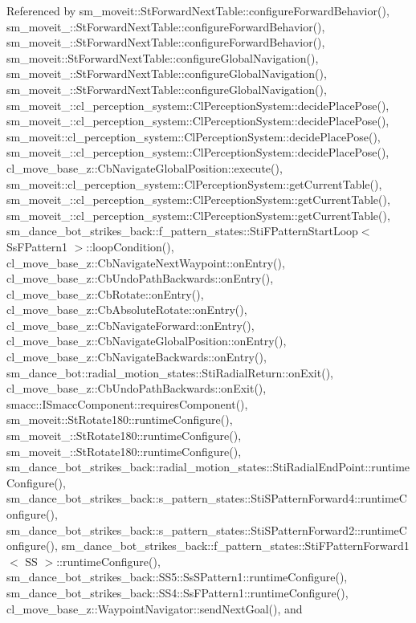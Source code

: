 Referenced by sm\+\_\+moveit\+::\+St\+Forward\+Next\+Table\+::configure\+Forward\+Behavior(), sm\+\_\+moveit\+\_\+::\+St\+Forward\+Next\+Table\+::configure\+Forward\+Behavior(), sm\+\_\+moveit\+\_\+::\+St\+Forward\+Next\+Table\+::configure\+Forward\+Behavior(), sm\+\_\+moveit\+::\+St\+Forward\+Next\+Table\+::configure\+Global\+Navigation(), sm\+\_\+moveit\+\_\+::\+St\+Forward\+Next\+Table\+::configure\+Global\+Navigation(), sm\+\_\+moveit\+\_\+::\+St\+Forward\+Next\+Table\+::configure\+Global\+Navigation(), sm\+\_\+moveit\+\_\+::cl\+\_\+perception\+\_\+system\+::\+Cl\+Perception\+System\+::decide\+Place\+Pose(), sm\+\_\+moveit\+\_\+::cl\+\_\+perception\+\_\+system\+::\+Cl\+Perception\+System\+::decide\+Place\+Pose(), sm\+\_\+moveit\+::cl\+\_\+perception\+\_\+system\+::\+Cl\+Perception\+System\+::decide\+Place\+Pose(), sm\+\_\+moveit\+\_\+::cl\+\_\+perception\+\_\+system\+::\+Cl\+Perception\+System\+::decide\+Place\+Pose(), cl\+\_\+move\+\_\+base\+\_\+z\+::\+Cb\+Navigate\+Global\+Position\+::execute(), sm\+\_\+moveit\+::cl\+\_\+perception\+\_\+system\+::\+Cl\+Perception\+System\+::get\+Current\+Table(), sm\+\_\+moveit\+\_\+::cl\+\_\+perception\+\_\+system\+::\+Cl\+Perception\+System\+::get\+Current\+Table(), sm\+\_\+moveit\+\_\+::cl\+\_\+perception\+\_\+system\+::\+Cl\+Perception\+System\+::get\+Current\+Table(), sm\+\_\+dance\+\_\+bot\+\_\+strikes\+\_\+back\+::f\+\_\+pattern\+\_\+states\+::\+Sti\+F\+Pattern\+Start\+Loop$<$ Ss\+F\+Pattern1 $>$\+::loop\+Condition(), cl\+\_\+move\+\_\+base\+\_\+z\+::\+Cb\+Navigate\+Next\+Waypoint\+::on\+Entry(), cl\+\_\+move\+\_\+base\+\_\+z\+::\+Cb\+Undo\+Path\+Backwards\+::on\+Entry(), cl\+\_\+move\+\_\+base\+\_\+z\+::\+Cb\+Rotate\+::on\+Entry(), cl\+\_\+move\+\_\+base\+\_\+z\+::\+Cb\+Absolute\+Rotate\+::on\+Entry(), cl\+\_\+move\+\_\+base\+\_\+z\+::\+Cb\+Navigate\+Forward\+::on\+Entry(), cl\+\_\+move\+\_\+base\+\_\+z\+::\+Cb\+Navigate\+Global\+Position\+::on\+Entry(), cl\+\_\+move\+\_\+base\+\_\+z\+::\+Cb\+Navigate\+Backwards\+::on\+Entry(), sm\+\_\+dance\+\_\+bot\+::radial\+\_\+motion\+\_\+states\+::\+Sti\+Radial\+Return\+::on\+Exit(), cl\+\_\+move\+\_\+base\+\_\+z\+::\+Cb\+Undo\+Path\+Backwards\+::on\+Exit(), smacc\+::\+I\+Smacc\+Component\+::requires\+Component(), sm\+\_\+moveit\+::\+St\+Rotate180\+::runtime\+Configure(), sm\+\_\+moveit\+\_\+::\+St\+Rotate180\+::runtime\+Configure(), sm\+\_\+moveit\+\_\+::\+St\+Rotate180\+::runtime\+Configure(), sm\+\_\+dance\+\_\+bot\+\_\+strikes\+\_\+back\+::radial\+\_\+motion\+\_\+states\+::\+Sti\+Radial\+End\+Point\+::runtime\+Configure(), sm\+\_\+dance\+\_\+bot\+\_\+strikes\+\_\+back\+::s\+\_\+pattern\+\_\+states\+::\+Sti\+S\+Pattern\+Forward4\+::runtime\+Configure(), sm\+\_\+dance\+\_\+bot\+\_\+strikes\+\_\+back\+::s\+\_\+pattern\+\_\+states\+::\+Sti\+S\+Pattern\+Forward2\+::runtime\+Configure(), sm\+\_\+dance\+\_\+bot\+\_\+strikes\+\_\+back\+::f\+\_\+pattern\+\_\+states\+::\+Sti\+F\+Pattern\+Forward1$<$ S\+S $>$\+::runtime\+Configure(), sm\+\_\+dance\+\_\+bot\+\_\+strikes\+\_\+back\+::\+S\+S5\+::\+Ss\+S\+Pattern1\+::runtime\+Configure(), sm\+\_\+dance\+\_\+bot\+\_\+strikes\+\_\+back\+::\+S\+S4\+::\+Ss\+F\+Pattern1\+::runtime\+Configure(), cl\+\_\+move\+\_\+base\+\_\+z\+::\+Waypoint\+Navigator\+::send\+Next\+Goal(), and 